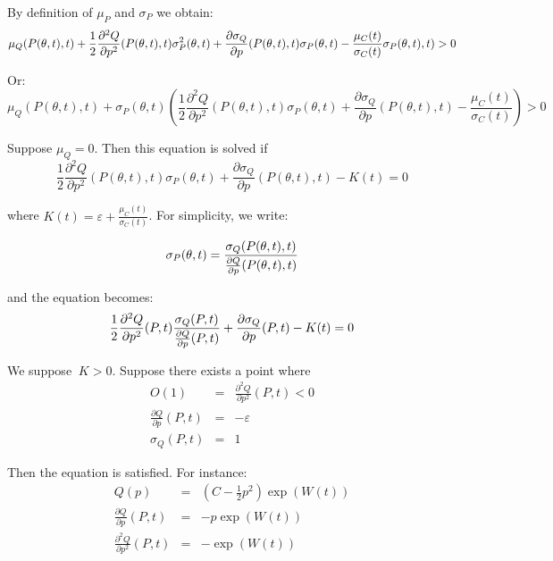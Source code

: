 \documentclass{article}
\begin{document}
By definition of $\mu _{P}$ and $\sigma _{P}$ we obtain:%
\begin{equation*}
\mu _{Q}(P(\theta ,t),t)+\frac{1}{2}\frac{\partial ^{2}Q}{\partial p^{2}}%
(P(\theta ,t),t)\sigma _{P}^{2}(\theta ,t)+\frac{\partial \sigma _{Q}}{%
\partial p}(P(\theta ,t),t)\sigma _{P}(\theta ,t)-\frac{\mu _{C}(t)}{\sigma
_{C}(t)}\sigma _{P}(\theta ,t),t)>0
\end{equation*}

Or:%
\begin{equation*}
\mu _{Q}(P(\theta ,t),t)+\sigma _{P}(\theta ,t)(\frac{1}{2}\frac{\partial
^{2}Q}{\partial p^{2}}(P(\theta ,t),t)\sigma _{P}(\theta ,t)+\frac{\partial
\sigma _{Q}}{\partial p}(P(\theta ,t),t)-\frac{\mu _{C}(t)}{\sigma _{C}(t)}%
)>0
\end{equation*}

Suppose $\mu _{Q}=0$. Then this equation is solved if%
\begin{equation*}
\frac{1}{2}\frac{\partial ^{2}Q}{\partial p^{2}}(P(\theta ,t),t)\sigma
_{P}(\theta ,t)+\frac{\partial \sigma _{Q}}{\partial p}(P(\theta
,t),t)-K(t)=0
\end{equation*}

where $K(t)=\varepsilon +\frac{\mu _{C}(t)}{\sigma _{C}(t)}$. For
simplicity, we write:

\begin{equation*}
\sigma _{P}(\theta ,t)=\frac{\sigma _{Q}(P(\theta ,t),t)}{\frac{\partial Q}{%
\partial p}(P(\theta ,t),t)}
\end{equation*}

and the equation becomes:%
\begin{equation}
\frac{1}{2}\frac{\partial ^{2}Q}{\partial p^{2}}(P,t)\frac{\sigma _{Q}(P,t)}{%
\frac{\partial Q}{\partial p}(P,t)}+\frac{\partial \sigma _{Q}}{\partial p}%
(P,t)-K(t)=0  \label{bofio}
\end{equation}

We suppose $\ K>0$. Suppose there exists a point where 
\begin{eqnarray*}
O(1) &=&\frac{\partial ^{2}Q}{\partial p^{2}}(P,t)<0 \\
\frac{\partial Q}{\partial p}(P,t) &=&-\varepsilon  \\
\sigma _{Q}(P,t) &=&1
\end{eqnarray*}

Then the equation is satisfied. For instance:%
\begin{eqnarray*}
Q(p) &=&(C-\frac{1}{2}p^{2})\exp (W(t)) \\
\frac{\partial Q}{\partial p}(P,t) &=&-p\exp (W(t)) \\
\frac{\partial ^{2}Q}{\partial p^{2}}(P,t) &=&-\exp (W(t))
\end{eqnarray*}
\end{document}
